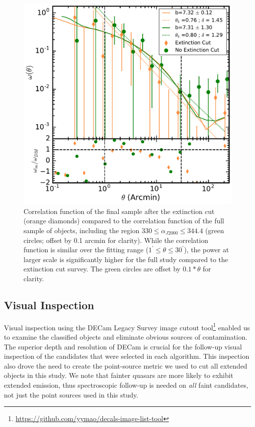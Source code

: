\documentclass[apj, numberedappendix]{emulateapj}
\begin{document}
\begin{figure}[h!]
\includegraphics[scale = 0.5]{./New_Plots/SpIES_corrfunc_extinctioncut.pdf}
\centering
\caption{\footnotesize{Correlation function of the final sample after the extinction cut (orange diamonds) compared to the correlation function of the full sample of objects, including the region $330 \leq \alpha_{J2000} \leq 344.4$ (green circles; offset by 0.1 arcmin for clarity). While the correlation function is similar over the fitting range ($1^\prime \leq \theta \leq 30^\prime$), the power at larger scale is significantly higher for the full study compared to the extinction cut survey. The green circles are offset by $0.1*\theta$ for clarity.}}\label{fig:extcut}
\end{figure}

\subsection{Visual Inspection}
Visual inspection using the DECam Legacy Survey image cutout tool\footnote{\url{https://github.com/yymao/decals-image-list-tool}} enabled us to examine the classified objects and eliminate obvious sources of contamination. The superior depth and resolution of DECam is crucial for the follow-up visual inspection of the candidates that were selected in each algorithm. This inspection also drove the need to create the point-source metric we used to cut all extended objects in this study. We note that fainter quasars are more likely to exhibit extended emission, thus spectroscopic follow-up is needed on \emph{all} faint candidates, not just the point sources used in this study.
\end{document}
